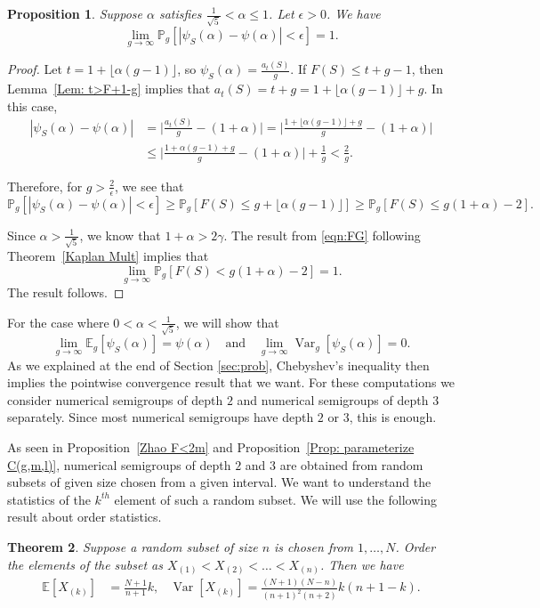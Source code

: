 \documentclass[12pt]{amsart}
\def\E{{\mathbb E}}
\renewcommand{\P}{\mathbb{P}}
\def\Var{{\operatorname{Var}}}
\newtheorem{theorem}{Theorem}
\newtheorem{proposition}[theorem]{Proposition}
\begin{document}
\begin{proposition}\label{Prop: pointwise large alpha}
Suppose $\alpha$ satisfies $\frac{1}{\sqrt{5}}<\alpha\leq 1$.  Let $\epsilon>0$.  We have
\[
\lim_{g\to\infty} \P_g[ |\psi_S(\alpha) -\psi(\alpha)|<\epsilon ] =1.
\]
\end{proposition}
\begin{proof}
Let $t=1+\lfloor\alpha (g-1)\rfloor$, so $\psi_S(\alpha)= \frac{a_{t}(S)}{g}$. If $F(S)\leq t+g-1$, then  Lemma~\ref{Lem: t>F+1-g} implies that $a_t(S) = t+g = 1+\lfloor\alpha (g-1)\rfloor + g$.  In this case,
\begin{align*}
|\psi_S(\alpha) -\psi(\alpha)|
&=\Big|\frac{a_t(S)}{g} - (1+\alpha)\Big|
= \Big|\frac{1+\lfloor\alpha (g-1)\rfloor +g}{g} - (1+\alpha)\Big|\\
&\leq \Big|\frac{1+\alpha (g-1) +g}{g} - (1+\alpha)\Big| +\frac{1}{g} 
<\frac{2}{g}.
\end{align*}


Therefore, for $g>\frac{2}{\epsilon}$, we see that
\[
\P_g[ |\psi_S(\alpha) -\psi(\alpha)|<\epsilon ] 
\ge \P_g[ F(S) \le  g+\lfloor\alpha (g-1)\rfloor]
\geq \P_g[ F(S) \le  g(1+\alpha) -2].
\]


Since $\alpha>\frac{1}{\sqrt{5}}$, we know that $1+\alpha>2\gamma$. The result from \eqref{eqn:FG} following Theorem~\ref{Kaplan Mult} implies that
\[
\lim_{g\to\infty} \P_g[ F(S)<  g(1+\alpha) -2] =1.
\]
The result follows. 
\end{proof}

For the case where $0<\alpha<\frac{1}{\sqrt{5}}$, we will show that 
\[
\lim_{g\to\infty} \E_g[\psi_S(\alpha)] =\psi(\alpha)\ \ \ \text{ and }\ \ \  \lim_{g\to\infty} \Var_g[\psi_S(\alpha)] =0.
\] 
As we explained at the end of Section \ref{sec:prob}, Chebyshev's inequality then implies the pointwise convergence result that we want.  For these computations we consider numerical semigroups of depth $2$ and numerical semigroups of depth $3$ separately. Since most numerical semigroups have depth $2$ or $3$, this is enough.

As seen in Proposition~\ref{Zhao F<2m} and Proposition~\ref{Prop: parameterize C(g,m,l)}, numerical semigroups of depth $2$ and $3$ are obtained from random subsets of  given size chosen from a given interval. We want to understand the statistics of the $k^{th}$ element of such a random subset. We will use the following result about order statistics.
\begin{theorem}\cite[Theorem 2]{o2022distribution}\label{Thm: order statistic}
Suppose a random subset of size $n$ is chosen from $1,\dots,N$. Order the elements of the subset as $X_{(1)}<X_{(2)}<\dots<X_{(n)}$.
Then we have
\begin{align*}
\E[X_{(k)}] &=\frac{N+1}{n+1}k,
&
\Var[X_{(k)}] =\frac{(N+1)(N-n)}{(n+1)^2 (n+2)} k (n+1-k).
\end{align*}
\end{theorem}
\end{document}
